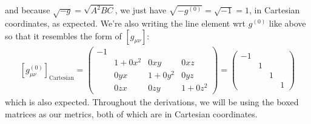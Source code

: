 \documentclass{book}
\theoremstyle{definition}
\begin{document}
and because $\sqrt{-g} = \sqrt{A^2BC}$, we just have $\sqrt{-g^{(0)}} = \sqrt{-1} = 1$, in Cartesian coordinates, as expected. We're also writing the line element wrt $g^{(0)}$ like above so that it resembles the form of $[g_{\mu\nu}]$:
\begin{align}
\boxed{[g^{(0)}_{\mu\nu}]_{\text{Cartesian}} = \begin{pmatrix}
-1 &&&\\
&1 + 0x^2&0xy&0xz\\
&0yx&1+0y^2&0yz\\
&0zx&0zy&1+0z^2
\end{pmatrix} = \begin{pmatrix}
-1 &&&\\
&1&&\\
&&1&\\
&&&1
\end{pmatrix}}
\end{align}
which is also expected. Throughout the derivations, we will be using the boxed matrices as our metrics, both of which are in Cartesian coordinates. \\
\end{document}

